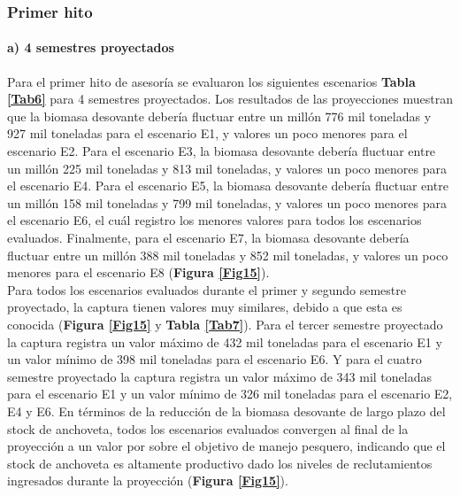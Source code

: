 \documentclass[letter,11pt]{article}
\begin{document}
\subsubsection{Primer hito}

\paragraph{a) 4 semestres proyectados}

\quad

Para el primer hito de asesor\'ia se evaluaron los siguientes escenarios
\textbf{Tabla \ref{Tab6}} para 4 semestres proyectados. Los resultados de
las proyecciones muestran que la biomasa desovante deber\'ia fluctuar entre
un mill\'on 776 mil toneladas y 927 mil toneladas para el escenario E1, y
valores un poco menores para el escenario E2. Para el escenario E3, la biomasa
desovante deber\'ia fluctuar entre un mill\'on 225 mil toneladas y 813 mil
toneladas, y valores un poco menores para el escenario E4. Para el 
escenario E5, la biomasa desovante deber\'ia fluctuar entre un mill\'on
158 mil toneladas y 799 mil toneladas, y valores un poco menores para el
escenario E6, el cu\'al registro los menores valores para todos los
escenarios evaluados. Finalmente, para el escenario E7, la biomasa
desovante deber\'ia fluctuar entre un mill\'on 388 mil toneladas y 852
mil toneladas, y valores un poco menores para el escenario E8 (\textbf{Figura \ref{Fig15}}).\\

Para todos los escenarios evaluados durante el primer y segundo semestre proyectado,
la captura tienen valores muy similares, debido a que esta es conocida
(\textbf{Figura \ref{Fig15}} y \textbf{Tabla \ref{Tab7}}). Para el
tercer semestre proyectado la captura registra un valor m\'aximo de 432
mil toneladas para el escenario E1 y un valor m\'inimo de 398 mil
toneladas para el escenario E6. Y para el cuatro semestre proyectado la
captura registra un valor m\'aximo de 343 mil toneladas para el escenario
E1 y un valor m\'inimo de 326 mil toneladas para el escenario E2, E4 y E6. En
t\'erminos de la reducci\'on de la biomasa desovante de largo plazo del
stock de anchoveta, todos los escenarios evaluados convergen al final de
la proyecci\'on a un valor por sobre el objetivo de manejo pesquero,
indicando que el stock de anchoveta es altamente productivo dado los
niveles de reclutamientos ingresados durante la proyecci\'on
(\textbf{Figura \ref{Fig15}}).\\
\end{document}
